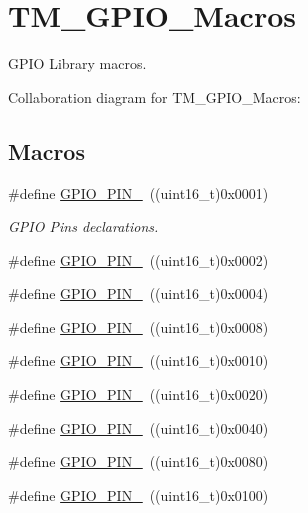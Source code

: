 \hypertarget{group___t_m___g_p_i_o___macros}{}\section{T\+M\+\_\+\+G\+P\+I\+O\+\_\+\+Macros}
\label{group___t_m___g_p_i_o___macros}


G\+P\+IO Library macros.  


Collaboration diagram for T\+M\+\_\+\+G\+P\+I\+O\+\_\+\+Macros\+:
\subsection*{Macros}
\begin{DoxyCompactItemize}
\item 
\#define \hyperlink{group___t_m___g_p_i_o___macros_ga176efbf43a259b7bb0a85a47401505be}{G\+P\+I\+O\+\_\+\+P\+I\+N\+\_}~((uint16\+\_\+t)0x0001)
\begin{DoxyCompactList}\small\item\em G\+P\+IO Pins declarations. \end{DoxyCompactList}\item 
\#define \hyperlink{group___t_m___g_p_i_o___macros_ga6c35af4e75c3cb57bb650feaa7a136b5}{G\+P\+I\+O\+\_\+\+P\+I\+N\+\_}~((uint16\+\_\+t)0x0002)
\item 
\#define \hyperlink{group___t_m___g_p_i_o___macros_ga6eee38b797a7268f04357dfa2759efd2}{G\+P\+I\+O\+\_\+\+P\+I\+N\+\_}~((uint16\+\_\+t)0x0004)
\item 
\#define \hyperlink{group___t_m___g_p_i_o___macros_gadcaf899c018a0dde572b5af783565c62}{G\+P\+I\+O\+\_\+\+P\+I\+N\+\_}~((uint16\+\_\+t)0x0008)
\item 
\#define \hyperlink{group___t_m___g_p_i_o___macros_gab3871e35868deecd260e586ad70d4b83}{G\+P\+I\+O\+\_\+\+P\+I\+N\+\_}~((uint16\+\_\+t)0x0010)
\item 
\#define \hyperlink{group___t_m___g_p_i_o___macros_ga01cc9ed93f6fd12fd3403362779aaa18}{G\+P\+I\+O\+\_\+\+P\+I\+N\+\_}~((uint16\+\_\+t)0x0020)
\item 
\#define \hyperlink{group___t_m___g_p_i_o___macros_ga9089f18f20ec88ee38ce6f27389e6d7e}{G\+P\+I\+O\+\_\+\+P\+I\+N\+\_}~((uint16\+\_\+t)0x0040)
\item 
\#define \hyperlink{group___t_m___g_p_i_o___macros_ga482cb86c2f036e630661a41e8986bcfe}{G\+P\+I\+O\+\_\+\+P\+I\+N\+\_}~((uint16\+\_\+t)0x0080)
\item 
\#define \hyperlink{group___t_m___g_p_i_o___macros_gaf5eb6a42a4428e236bd4fd08ade71e7a}{G\+P\+I\+O\+\_\+\+P\+I\+N\+\_}~((uint16\+\_\+t)0x0100)

\end{DoxyCompactItemize}
